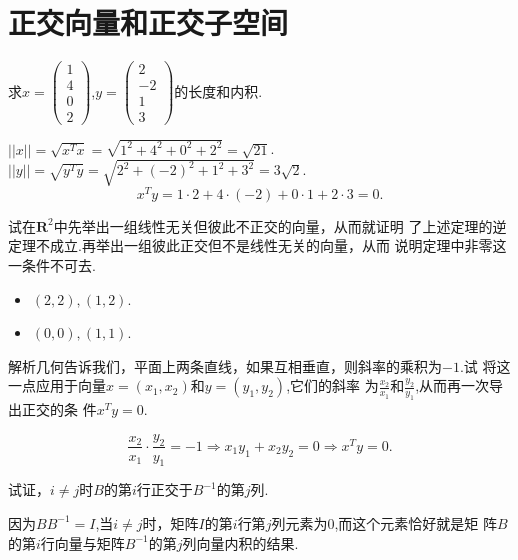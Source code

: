 ﻿\documentclass{book} \usepackage{exsheets} \usepackage{xeCJK}
\begin{document}
\section{正交向量和正交子空间}
\begin{question}
  求$x=
  \begin{pmatrix}
    1\\
    4\\
    0\\
    2
  \end{pmatrix}
  $,$y=
  \begin{pmatrix}
    2\\
    -2\\
    1\\
    3
  \end{pmatrix}
  $的长度和内积.
\end{question}
\begin{solution}
  $||x||=\sqrt{x^Tx}=\sqrt{1^2+4^2+0^2+2^2}=\sqrt{21}$.$||y||=\sqrt{y^Ty}=\sqrt{2^2+(-2)^2+1^2+3^2}=3
  \sqrt{2}$.
$$
x^Ty=1\cdot 2+4\cdot (-2)+0\cdot 1+2\cdot 3=0.
$$
\end{solution}
\begin{question}
  试在$\mathbf{R}^2$中先举出一组线性无关但彼此不正交的向量，从而就证明
  了上述定理的逆定理不成立.再举出一组彼此正交但不是线性无关的向量，从而
  说明定理中非零这一条件不可去.
\end{question}
\begin{solution}
  \begin{itemize}
  \item   $(2,2),(1,2)$.
  \item   $(0,0),(1,1)$.
  \end{itemize}
\end{solution}
\begin{question}
  解析几何告诉我们，平面上两条直线，如果互相垂直，则斜率的乘积为$-1$.试
  将这一点应用于向量$x=(x_1,x_2)$和$y=(y_1,y_2)$,它们的斜率
  为$\frac{x_2}{x_1}$和$\frac{y_2}{y_1}$,从而再一次导出正交的条
  件$x^Ty=0$.
\end{question}
\begin{solution}
  $$
  \frac{x_2}{x_1}\cdot \frac{y_2}{y_1}=-1\Rightarrow
  x_1y_1+x_2y_2=0\Rightarrow x^Ty=0.
  $$
\end{solution}
\begin{question}
  试证，$i\neq j$时$B$的第$i$行正交于$B^{-1}$的第$j$列.
\end{question}
\begin{solution}
  因为$BB^{-1}=I$,当$i\neq
  j$时，矩阵$I$的第$i$行第$j$列元素为$0$,而这个元素恰好就是矩
  阵$B$的第$i$行向量与矩阵$B^{-1}$的第$j$列向量内积的结果.
\end{solution}
\end{document}
